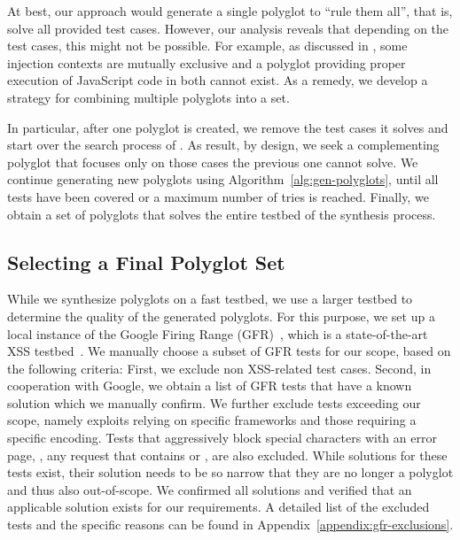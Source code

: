 

At best, our approach would generate a single polyglot to ``rule them all'', that is, solve all provided test cases.
However, our analysis reveals that depending on the test cases, this might not be possible.
For example, as discussed in , some injection contexts are mutually exclusive and a polyglot providing proper execution of JavaScript code in both cannot exist.
As a remedy, we develop a strategy for combining multiple polyglots into a set. 

In particular, after one polyglot is created, we remove the test cases it solves and start over the search process of \mcts{}.
As result, by design, we seek a complementing polyglot that focuses only on those cases the previous one cannot solve.
We continue generating new polyglots using Algorithm~\ref{alg:gen-polyglots}, until all tests have been covered or a maximum number of tries is reached.
Finally, we obtain a set of polyglots that solves the entire testbed of the synthesis process.

\subsection{Selecting a Final Polyglot Set}%
\label{sec:polyglot-evaluation}

While we synthesize polyglots on a fast testbed, we use a larger testbed to determine the quality of the generated polyglots.
For this purpose, we set up a local instance of the Google Firing Range (GFR)~\cite{github-firing-range}, which is a state-of-the-art XSS testbed~\cite{BazCriMag16}.
We manually choose a subset of GFR tests for our scope, based on the following criteria:
First, we exclude non XSS-related test cases.
Second, in cooperation with Google, we obtain a list of GFR tests that have a known solution which we manually confirm.
We further exclude tests exceeding our scope, namely exploits relying on specific frameworks and those requiring a specific encoding.
Tests that aggressively block special characters with an error page, \eg, any request that contains \code{<} or \code{>}, are also excluded.
While solutions for these tests exist, their solution needs to be so narrow that they are no longer a polyglot and thus also out-of-scope. 
We confirmed all solutions and verified that an applicable solution exists for our requirements.
A detailed list of the excluded tests and the specific reasons can be found in Appendix~\ref{appendix:gfr-exclusions}. %

